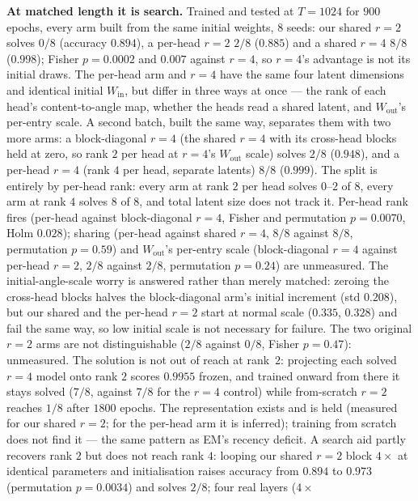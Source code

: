 \documentclass[11pt]{article}
\begin{document}
\textbf{At matched length it is search.} Trained and tested at $T=1024$ for $900$
epochs, every arm built from the same initial weights, $8$ seeds: our shared $r=2$
solves $0/8$ (accuracy $0.894$), a per-head $r=2$ $2/8$ ($0.885$) and a
shared $r=4$ $8/8$ ($0.998$); Fisher $p=0.0002$ and $0.007$ against $r=4$, so $r=4$'s
advantage is not its initial draws. The per-head arm and $r=4$ have the same four
latent dimensions and identical initial $W_{\mathrm{in}}$, but differ in three ways at
once --- the rank of each head's content-to-angle map, whether the heads read a shared
latent, and $W_{\mathrm{out}}$'s per-entry scale. A second batch, built the same way,
separates them with two more arms: a block-diagonal $r=4$ (the shared $r=4$ with its
cross-head blocks held at zero, so rank $2$ per head at $r=4$'s $W_{\mathrm{out}}$ scale)
solves $2/8$ ($0.948$), and a per-head $r=4$ (rank $4$ per head, separate latents) $8/8$
($0.999$). The split is entirely by per-head rank: every arm at rank $2$ per head solves
$0$--$2$ of $8$, every arm at rank $4$ solves $8$ of $8$, and total latent size does not
track it. Per-head rank fires (per-head against block-diagonal $r=4$, Fisher and permutation
$p=0.0070$, Holm $0.028$); sharing (per-head against shared $r=4$, $8/8$ against $8/8$,
permutation $p=0.59$) and $W_{\mathrm{out}}$'s per-entry scale (block-diagonal $r=4$ against
per-head $r=2$, $2/8$ against $2/8$, permutation $p=0.24$) are unmeasured. The
initial-angle-scale worry is answered rather than merely matched: zeroing the cross-head
blocks halves the block-diagonal arm's initial increment (std $0.208$), but our shared and
the per-head $r=2$ start at normal scale ($0.335$, $0.328$) and fail the same way, so low
initial scale is not necessary for failure. The two original $r=2$ arms are not
distinguishable ($2/8$ against $0/8$, Fisher $p=0.47$): unmeasured. The solution is not out of reach at
rank~$2$: projecting each solved $r=4$ model onto rank $2$ scores $0.9955$ frozen, and
trained onward from there it stays solved ($7/8$, against $7/8$ for the $r=4$ control)
while from-scratch $r=2$ reaches $1/8$ after $1800$ epochs. The representation exists
and is held (measured for our shared $r=2$; for the per-head arm it is inferred); training from scratch does not find it --- the same pattern as EM's
recency deficit. A search aid partly recovers rank $2$ but does not reach rank $4$: looping
our shared $r=2$ block $4\times$ at identical parameters and initialisation raises accuracy
from $0.894$ to $0.973$ (permutation $p=0.0034$) and solves $2/8$; four real layers ($4\times$
\end{document}
